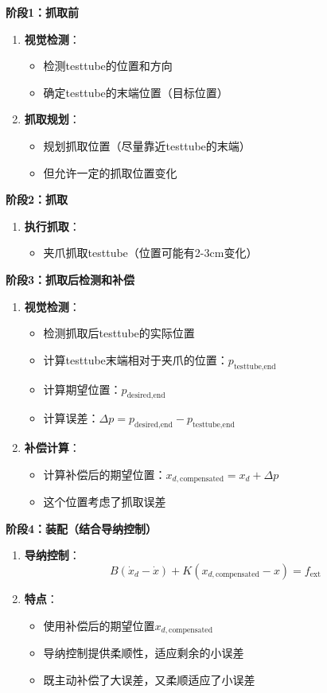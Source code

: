 \documentclass[12pt,a4paper]{article}
\begin{document}
\textbf{阶段1：抓取前}
\begin{enumerate}
\item \textbf{视觉检测}：
\begin{itemize}
\item 检测testtube的位置和方向
\item 确定testtube的末端位置（目标位置）
\end{itemize}

\item \textbf{抓取规划}：
\begin{itemize}
\item 规划抓取位置（尽量靠近testtube的末端）
\item 但允许一定的抓取位置变化
\end{itemize}
\end{enumerate}

\textbf{阶段2：抓取}
\begin{enumerate}
\item \textbf{执行抓取}：
\begin{itemize}
\item 夹爪抓取testtube（位置可能有2-3cm变化）
\end{itemize}
\end{enumerate}

\textbf{阶段3：抓取后检测和补偿}
\begin{enumerate}
\item \textbf{视觉检测}：
\begin{itemize}
\item 检测抓取后testtube的实际位置
\item 计算testtube末端相对于夹爪的位置：$p_{\text{testtube,end}}$
\item 计算期望位置：$p_{\text{desired,end}}$
\item 计算误差：$\Delta p = p_{\text{desired,end}} - p_{\text{testtube,end}}$
\end{itemize}

\item \textbf{补偿计算}：
\begin{itemize}
\item 计算补偿后的期望位置：$x_{d,\text{compensated}} = x_d + \Delta p$
\item 这个位置考虑了抓取误差
\end{itemize}
\end{enumerate}

\textbf{阶段4：装配（结合导纳控制）}
\begin{enumerate}
\item \textbf{导纳控制}：
\begin{equation}
B(\dot{x}_d - \dot{x}) + K(x_{d,\text{compensated}} - x) = f_{\text{ext}}
\end{equation}

\item \textbf{特点}：
\begin{itemize}
\item 使用补偿后的期望位置$x_{d,\text{compensated}}$
\item 导纳控制提供柔顺性，适应剩余的小误差
\item 既主动补偿了大误差，又柔顺适应了小误差
\end{itemize}
\end{enumerate}
\end{document}

